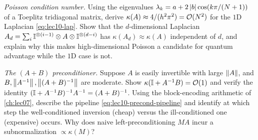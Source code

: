 \begin{exercise}\label{ex:lec10-7}
\emph{Poisson condition number.} Using the eigenvalues
$\lambda_k=a+2\left\lvert b \right\rvert\cos(k\pi/(N+1))$ of a Toeplitz tridiagonal matrix, derive
$\kappa(A)\approx4/(h^2\pi^2)=\mathcal{O}(N^2)$ for the $1$D Laplacian
\eqref{eq:lec10-lap}. Show that the $d$-dimensional Laplacian
$A_d=\sum_i\mathbb{I}^{\otimes(i-1)}\otimes A\otimes\mathbb{I}^{\otimes(d-i)}$ has
$\kappa(A_d)\approx\kappa(A)$ independent of $d$, and explain why this makes
high-dimensional Poisson a candidate for quantum advantage while the $1$D case is not.
\end{exercise}

\begin{exercise}\label{ex:lec10-8}
\emph{The $(A+B)$ preconditioner.} Suppose $A$ is easily invertible with large
$\left\lVert A \right\rVert$, and $B,\left\lVert A^{-1} \right\rVert,\left\lVert (A+B)^{-1} \right\rVert$ are moderate. Show
$\kappa(\mathbb{I}+A^{-1}B)=\mathcal{O}(1)$ and verify the identity
$(\mathbb{I}+A^{-1}B)^{-1}A^{-1}=(A+B)^{-1}$. Using the block-encoding arithmetic of
\cref{ch:lec07}, describe the pipeline \eqref{eq:lec10-precond-pipeline} and identify at
which step the well-conditioned inversion (cheap) versus the ill-conditioned one
(expensive) occurs. Why does naive left-preconditioning $M A$ incur a subnormalization
$\propto\kappa(M)$?
\end{exercise}

